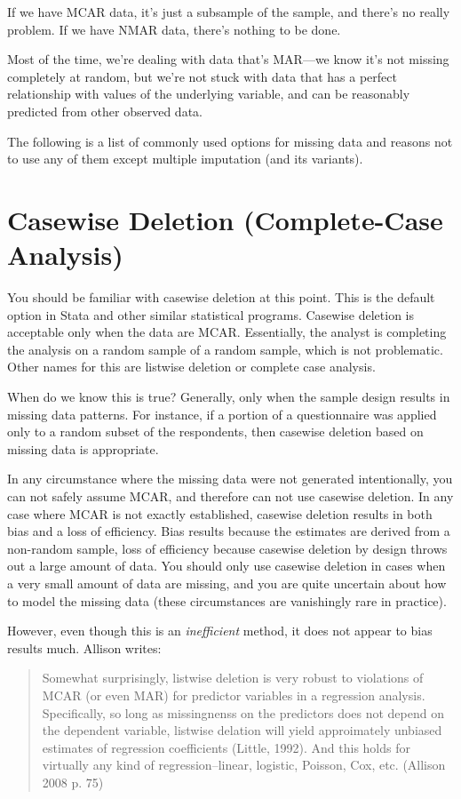 \documentclass[12 pt]{article}
\begin{document}
If we have MCAR data, it's just a subsample of the sample, and there's
no really problem. If we have NMAR data, there's nothing to be done. 

Most of the time, we're dealing with data that's MAR---we know it's
not missing completely at random, but we're not stuck with data that
has a perfect relationship with values of the underlying variable, and
can be reasonably predicted from other observed data. 

The following is a list of commonly used options for missing data and
reasons not to use any of them except multiple imputation (and its
variants). 

\section{Casewise Deletion (Complete-Case Analysis)}
\label{sec:casew-delet-compl}

You should be familiar with casewise deletion at this point. This is
the default option in Stata and other similar statistical programs. Casewise
deletion is acceptable only when the data are MCAR. Essentially, the
analyst is completing the analysis on a random sample of a random
sample, which is not problematic.  Other names for this are listwise
deletion or complete case analysis. 

When do we know this is true? Generally, only when the sample design
results in missing data patterns. For instance, if a portion of a
questionnaire was applied only to a random subset of the respondents,
then casewise deletion based on missing data is appropriate.

In any circumstance where the missing data were not generated
intentionally, you can not safely assume MCAR, and therefore can not
use casewise deletion. In any case where MCAR is not exactly
established, casewise deletion results in both bias and a loss of
efficiency. Bias results because the estimates are derived from a
non-random sample, loss of efficiency because casewise deletion by
design throws out a large amount of data. You should only use casewise
deletion in cases when a very small amount of data are missing, and
you are quite uncertain about how to model the missing data (these
circumstances are vanishingly rare in practice). 

However, even though this is an \emph{inefficient} method, it does not
appear to bias results much. Allison writes:

\begin{quote}
  Somewhat surprisingly, listwise deletion is very robust to
  violations of MCAR (or even MAR) for predictor variables in a
  regression analysis. Specifically, so long as missingnenss on the
  predictors does not depend on the dependent variable, listwise
  delation will yield approimately unbiased estimates of regression
  coefficients (Little, 1992). And this holds for virtually any kind
  of regression--linear, logistic, Poisson, Cox, etc. (Allison 2008
  p. 75)
\end{quote}
\end{document}
